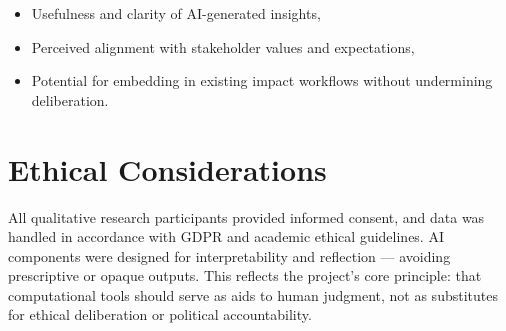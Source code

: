 \begin{itemize}
    \item Usefulness and clarity of AI-generated insights,
    \item Perceived alignment with stakeholder values and expectations,
    \item Potential for embedding in existing impact workflows without undermining deliberation.
\end{itemize}

\section{Ethical Considerations}\label{sec:ethical-considerations}

All qualitative research participants provided informed consent, and data was handled in accordance with GDPR and academic ethical guidelines.
AI components were designed for interpretability and reflection — avoiding prescriptive or opaque outputs.
This reflects the project's core principle: that computational tools should serve as aids to human judgment, not as substitutes for ethical deliberation or political accountability.